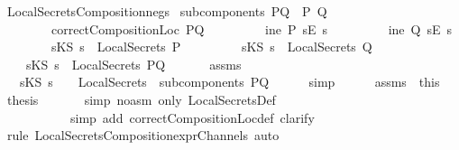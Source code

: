 \begin{isabellebody}
\isamarkupfalse%
%
\endisatagproof
{\isafoldproof}%
%
\isadelimproof
\isanewline
%
\endisadelimproof
\isanewline
{}\isamarkupfalse%
\ LocalSecretsComposition{\isacharunderscore}neg{}{\isacharunderscore}s{\isacharcolon}\isanewline
{}\ {\isachardoublequoteopen}subcomponents\ PQ\ {\isacharequal}\ {\isacharbraceleft}P{\isacharcomma}\ Q{\isacharbraceright}{\isachardoublequoteclose}\isanewline
\ \ \ \ \ \ \ \ {\isachardoublequoteopen}correctCompositionLoc\ PQ{\isachardoublequoteclose}\isanewline
\ \ \ \ \ \ \ \ {\isachardoublequoteopen}{\isasymnot}\ ine\ P\ {\isacharparenleft}sE\ s{\isacharparenright}{\isachardoublequoteclose}\isanewline
\ \ \ \ \ \ \ \ {\isachardoublequoteopen}{\isasymnot}\ ine\ Q\ {\isacharparenleft}sE\ s{\isacharparenright}{\isachardoublequoteclose}\isanewline
\ \ \ \ \ \ \ \ {\isachardoublequoteopen}sKS\ s\ {\isasymnotin}\ LocalSecrets\ P{\isachardoublequoteclose}\ \isanewline
\ \ \ \ \ \ \ \ {\isachardoublequoteopen}sKS\ s\ {\isasymnotin}\ LocalSecrets\ Q{\isachardoublequoteclose}\isanewline
{}\ \ \ \ {\isachardoublequoteopen}sKS\ s\ {\isasymnotin}\ LocalSecrets\ PQ{\isachardoublequoteclose}\isanewline
%
\isadelimproof
%
\endisadelimproof
%
\isatagproof
{}\isamarkupfalse%
\ {\isacharminus}\ \isanewline
\ \ \isamarkupfalse%
\ assms\ \isamarkupfalse%
\ \isanewline
\ \ \ {\isachardoublequoteopen}sKS\ s\ {\isasymnotin}\ \ {\isasymUnion}\ {\isacharparenleft}LocalSecrets\ {\isacharbackquote}\ subcomponents\ PQ{\isacharparenright}{\isachardoublequoteclose}\isanewline
\ \ \ \ \isamarkupfalse%
\ simp\isanewline
\ \ \ \isamarkupfalse%
\ \ assms\ \ this\ \isamarkupfalse%
\ {\isacharquery}thesis\ \isanewline
\ \ \ \ \isamarkupfalse%
\ {\isacharparenleft}simp\ {\isacharparenleft}no{\isacharunderscore}asm{\isacharparenright}\ only{\isacharcolon}\ LocalSecretsDef{\isacharcomma}\ \isanewline
\ \ \ \ \ \ \ \ \ \ \ simp\ add{\isacharcolon}\ correctCompositionLoc{\isacharunderscore}def{\isacharcomma}\ clarify{\isacharparenright}\isanewline
\ \ \ \ \isamarkupfalse%
\ {\isacharparenleft}rule\ LocalSecretsComposition{\isacharunderscore}exprChannel{\isacharunderscore}s{\isacharcomma}\ auto{\isacharparenright}\isanewline
{}\isamarkupfalse%
%
\endisatagproof
{\isafoldproof}%
%
\isadelimproof
\ \ \isanewline
%
\endisadelimproof
\isanewline
{}\isamarkupfalse%

\end{isabellebody}
